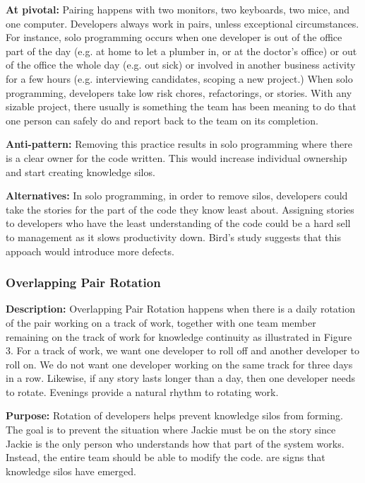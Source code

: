 \begin{table}[]
\textbf{At pivotal:} Pairing happens with two monitors, two keyboards, two mice, and one computer. Developers always work in pairs, unless exceptional circumstances. For instance, solo programming occurs when one developer is out of the office part of the day (e.g. at home to let a plumber in, or at the doctor's office) or out of the office the whole day (e.g. out sick) or involved in another business activity for a few hours (e.g. interviewing candidates, scoping a new project.) When solo programming, developers take low risk chores, refactorings, or stories. With any sizable project, there usually is something the team has been meaning to do that one person can safely do and report back to the team on its completion.  

\textbf{Anti-pattern:} Removing this practice results in solo programming where there is a clear owner for the code written. This would increase individual ownership and start creating knowledge silos. 

\textbf{Alternatives:}  In solo programming, in order to remove silos, developers could take the stories for the part of the code they know least about. Assigning stories to developers who have the least understanding of the code could be a hard sell to management as it slows productivity down. Bird's study \cite{BirdDontTouchMyCode} suggests that this appoach would introduce more defects. 

\subsubsection{Overlapping Pair Rotation}
\textbf{Description:} Overlapping Pair Rotation happens when there is a daily rotation of the pair working on a track of work, together with one team member remaining on the track of work for knowledge continuity as illustrated in Figure 3. For a track of work, we want one developer to roll off and another developer to roll on.  We do not want one developer working on the same track for three days in a row. Likewise, if any story lasts longer than a day, then one developer needs to rotate. Evenings provide a natural rhythm to rotating work. 

\textbf{Purpose:} Rotation of developers helps prevent knowledge silos from forming. The goal is to prevent the situation where Jackie must be on the story since Jackie is the only person who understands how that part of the system works. Instead, the entire team should be able to modify the code.  are signs that knowledge silos have emerged. 


\end{table}
